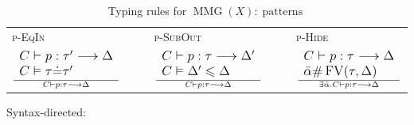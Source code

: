 \documentclass{article}
\newcommand{\tmname}[1]{\textsc{#1}}
\newcommand{\tmop}[1]{\ensuremath{\operatorname{#1}}}
\begin{document}
\begin{table}[t]
  \begin{tabular}{lllll}
    {\tmname{p-EqIn}} &  & {\tmname{p-SubOut}} &  & {\tmname{p-Hide}}\\
    $\large{\frac{\begin{array}{l}
      C \vdash p : \tau^{\prime} \longrightarrow \Delta\\
      C \vDash \tau \dot{=} \tau^{\prime}
    \end{array}}{C \vdash p : \tau \longrightarrow \Delta}}$ &  \ \  &
    $\large{\frac{\begin{array}{l}
      C \vdash p : \tau \longrightarrow \Delta^{\prime}\\
      C \vDash \Delta^{\prime} \leqslant \Delta
    \end{array}}{C \vdash p : \tau \longrightarrow \Delta}}$ &  \ \  &
    $\large{\frac{\begin{array}{l}
      C \vdash p : \tau \longrightarrow \Delta\\
      \bar{\alpha} \# \tmop{FV} (\tau, \Delta)
    \end{array}}{\exists \bar{\alpha} .C \vdash p : \tau \longrightarrow
    \Delta}}$
  \end{tabular}\label{TypRulPat}
  \caption{Typing rules for $\tmop{MMG} (X) : \tmop{patterns}$}
\end{table}\begin{table}[t]
  Syntax-directed:
  

\end{table}
\end{document}
